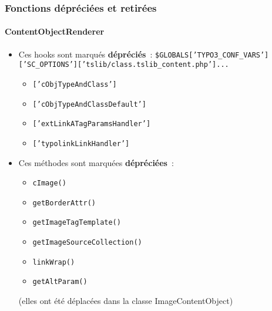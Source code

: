 \begin{frame}[fragile]
	\frametitle{Fonctions dépréciées et retirées}
	\framesubtitle{ContentObjectRenderer}

	\begin{itemize}
		\item Ces hooks sont marqués \textbf{dépréciés}~:\newline
			\tiny
				\texttt{\$GLOBALS['TYPO3\_CONF\_VARS']['SC\_OPTIONS']['tslib/class.tslib\_content.php']...}
			\normalsize

			\begin{itemize}\smaller
				\item \texttt{['cObjTypeAndClass']}
				\item \texttt{['cObjTypeAndClassDefault']}
				\item \texttt{['extLinkATagParamsHandler']}
				\item \texttt{['typolinkLinkHandler']}
			\end{itemize}

		\item Ces méthodes sont marquées \textbf{dépréciées}~:

			\begin{itemize}\smaller
				\item \texttt{cImage()}
				\item \texttt{getBorderAttr()}
				\item \texttt{getImageTagTemplate()}
				\item \texttt{getImageSourceCollection()}
				\item \texttt{linkWrap()}
				\item \texttt{getAltParam()}
			\end{itemize}

			\smaller
				(elles ont été déplacées dans la classe ImageContentObject)
			\normalsize

	\end{itemize}

\end{frame}


